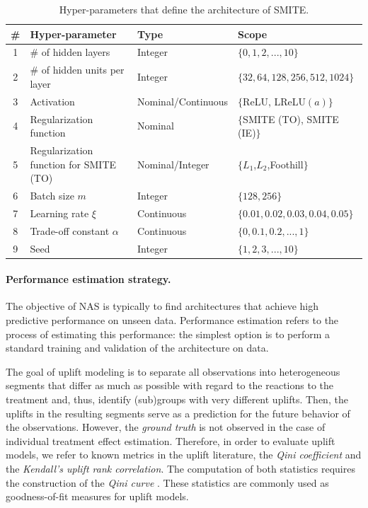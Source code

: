\documentclass{article}
\begin{document}
\begin{table}[htb]
    \caption{Hyper-parameters that define the architecture of SMITE.}
    \centering
    \begin{tabular}{|c||l|l|l|}
         \hline
         \# &  Hyper-parameter & Type & Scope\\
         \hline
         1 & \# of hidden layers & Integer & $\{0,1,2,...,10\}$\\
         2 & \# of hidden units per layer & Integer & $\{32,64,128,256,512,1024\}$\\
         3 & Activation & Nominal/Continuous & $\{$ReLU, LReLU$(a)\}$\\
         4 & Regularization function & Nominal & $\{$SMITE (TO), SMITE (IE)$\}$ \\
         5 & Regularization function for SMITE (TO) & Nominal/Integer & $\{L_1$,$L_2$,Foothill$\}$\\
         6 & Batch size $m$ & Integer & $\{128,256\}$ \\
         7 & Learning rate $\xi$ & Continuous & $\{0.01,0.02,0.03,0.04,0.05\}$ \\
         8 & Trade-off constant $\alpha$ & Continuous & $\{0,0.1,0.2,...,1\}$ \\
         9 & Seed & Integer & $\{1,2,3,...,10\}$ \\
         \hline
    \end{tabular}
    \label{tab:NAS}
\end{table}


\paragraph{Performance estimation strategy.}

The objective of NAS is typically to find architectures that achieve high predictive performance on unseen data. Performance
estimation refers to the process of estimating this performance: the simplest option is to perform a standard training and validation of the architecture on data.

The goal of uplift modeling is to separate all observations into heterogeneous segments that differ as much as possible with regard to the reactions to the treatment and, thus, identify (sub)groups with very different uplifts. Then, the uplifts in the resulting segments serve as a prediction for the future behavior of the
observations. However, the \textit{ground truth} is not observed in the case of individual treatment effect estimation. Therefore, in order to evaluate uplift models, we refer to known metrics in the uplift literature, the {\it Qini coefficient} and the {\it Kendall's uplift rank correlation}. The computation of both statistics requires the construction of the {\it Qini curve} \citep{radcliffe2007using}. These statistics are commonly used as goodness-of-fit measures for uplift models.
\end{document}
